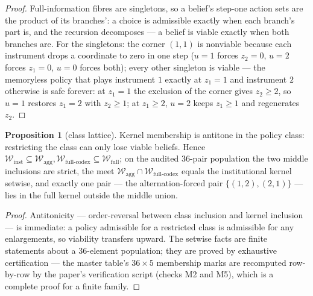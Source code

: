 \documentclass[10pt,twocolumn]{article}
\theoremstyle{definition}
\newtheorem{proposition}{Proposition}
\begin{document}
\begin{proof}
Full-information fibres are singletons, so a belief's step-one action
sets are the product of its branches': a choice is admissible exactly
when each branch's part is, and the recursion decomposes --- a belief is
viable exactly when both branches are. For the singletons: the corner
\((1,1)\) is nonviable because each instrument drops a coordinate to
zero in one step (\(u = 1\) forces \(z_2 = 0\), \(u = 2\) forces
\(z_1 = 0\), \(u = 0\) forces both); every other singleton is viable
--- the memoryless policy that plays instrument \(1\) exactly at
\(z_1 = 1\) and instrument \(2\) otherwise is safe forever: at
\(z_1 = 1\) the exclusion of the corner gives \(z_2 \ge 2\), so
\(u = 1\) restores \(z_1 = 2\) with \(z_2 \ge 1\); at
\(z_1 \ge 2\), \(u = 2\) keeps \(z_1 \ge 1\) and regenerates
\(z_2\).
\end{proof}

\begin{proposition}[class lattice]\label{prop:lattice}
Kernel membership is antitone in the policy class: restricting the class
can only lose viable beliefs. Hence
\(\mathcal{W}_{\mathrm{inst}} \subseteq \mathcal{W}_{\mathrm{agg}},
\mathcal{W}_{\mathrm{full\text{-}codex}} \subseteq
\mathcal{W}_{\mathrm{full}}\); on the audited 36-pair population the
two middle inclusions are strict, the meet
\(\mathcal{W}_{\mathrm{agg}} \cap
\mathcal{W}_{\mathrm{full\text{-}codex}}\) equals the institutional
kernel setwise, and exactly one pair --- the alternation-forced pair
\(\{(1,2),(2,1)\}\) --- lies in the full kernel outside the middle
union.
\end{proposition}

\begin{proof}
Antitonicity --- order-reversal between class inclusion and kernel inclusion --- is immediate: a policy admissible for a restricted class is
admissible for any enlargements, so viability transfers upward. The
setwise facts are finite statements about a 36-element population; they
are proved by exhaustive certification --- the master table's
\(36 \times 5\) membership marks are recomputed row-by-row by the paper's verification script (checks M2 and M5), which is a complete
proof for a finite family.
\end{proof}
\end{document}
